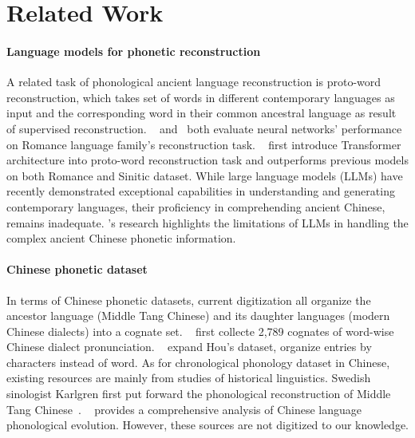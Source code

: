 \section{Related Work}
\paragraph{Language models for phonetic reconstruction}
A related task of phonological ancient language reconstruction is proto-word reconstruction, which takes set of words in different contemporary languages as input and the corresponding word in their common ancestral language as result of supervised reconstruction. ~\citet{meloni_ab_2021} and~\citet{akavarapu_cognate_2023} both evaluate neural networks' performance on Romance language family's reconstruction task. ~\citet{kim_transformed_2023} first introduce Transformer architecture into proto-word reconstruction task and outperforms previous models on both Romance and Sinitic dataset. 
While large language models (LLMs) have recently demonstrated exceptional capabilities in understanding and generating contemporary languages, their proficiency in comprehending ancient Chinese, remains inadequate. \citet{zhang-li-2023-large}'s research highlights the limitations of LLMs in handling the complex ancient Chinese phonetic information.
\paragraph{Chinese phonetic dataset}
In terms of Chinese phonetic datasets, current digitization all organize the ancestor language (Middle Tang Chinese) and its daughter languages (modern Chinese dialects) into a cognate set. ~\citet{hou_j_xiandai_2004} first collecte 2,789 cognates of word-wise Chinese dialect pronunciation. ~\citet{chang_wikihan_2022} expand Hou's dataset, organize entries by characters instead of word.
As for chronological phonology dataset in Chinese, existing resources are mainly from studies of historical linguistics. Swedish sinologist Karlgren first put forward the phonological reconstruction of Middle Tang Chinese~\cite{TheReconstructionofAncientChinese}. ~\citet{wang_l_hanyu_2012} provides a comprehensive analysis of Chinese language phonological evolution. However, these sources are not digitized to our knowledge.